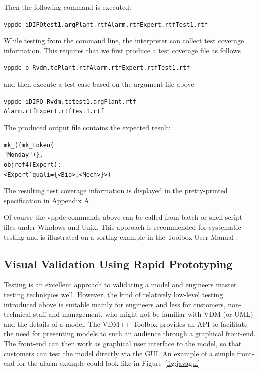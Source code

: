 \documentclass[\pformat,12pt,twoside]{article}
\begin{document}
Then the following command is executed: 

\small
\begin{alltt}
  vppde -iDIPQ test1.arg Plant.rtf Alarm.rtf Expert.rtf Test1.rtf
\end{alltt}
\normalsize

While testing from the command line, the interpreter can collect 
test coverage information. This requires that we first produce 
a test coverage file as follows

\small
\begin{alltt}
  vppde -p -R vdm.tc Plant.rtf Alarm.rtf Expert.rtf Test1.rtf
\end{alltt}
\normalsize

and then execute a test case based on the argument file above

\small
\begin{alltt}
  vppde -iDIPQ -R vdm.tc test1.arg Plant.rtf
                         Alarm.rtf Expert.rtf Test1.rtf
\end{alltt}
\normalsize

The produced output file contains the expected result:

\small
\begin{alltt}
  mk\_( \{ mk\_token( 
   "Monday" ) \},
   objref4(Expert):
   \texttt{<} Expert\`{}quali = \{ \texttt{<}Bio\texttt{>},\texttt{<}Mech\texttt{>} \} \texttt{>} )
\end{alltt}
\normalsize

The resulting test coverage information is displayed in the pretty-printed 
specification in Appendix A.

Of course the vppde commands above can be called from batch or 
shell script files under Windows and Unix. This approach is recommended 
for systematic testing and is illustrated on a sorting example 
in the Toolbox User Manual \cite{UserManPP-SCSK}.

\subsection{Visual Validation Using Rapid Prototyping}

Testing is an excellent approach to validating a model and engineers 
master testing techniques well. However, the kind of relatively 
low-level testing introduced above is suitable mainly for engineers 
and less for customers, non-technical staff and management, who 
might not be familiar with VDM (or UML) and the details of a 
model. The VDM++ Toolbox provides an API to facilitate the need 
for presenting models to such an audience through a graphical 
front-end. The front-end can then work as graphical user interface 
to the model, so that customers can test the model directly via 
the GUI. An example of a simple front-end for the alarm example 
could look like in Figure~\ref{fig:javagui}
\end{document}
